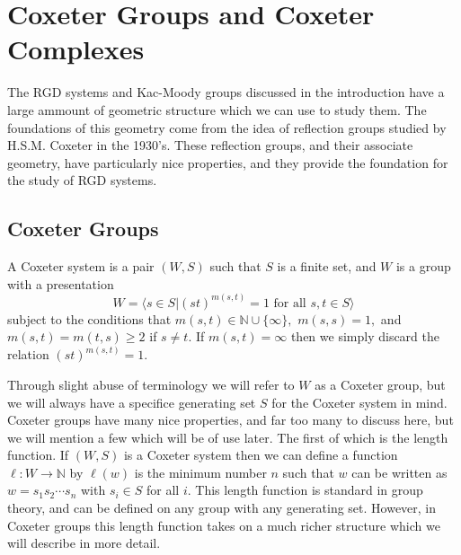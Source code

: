\documentclass[class=book, crop=false,12 pt]{standalone}
\begin{document}
\chapter{Coxeter Groups and Coxeter Complexes}
\label{ch:coxeter}
The RGD systems and Kac-Moody groups discussed in the introduction have a large ammount of geometric structure which we can use to study them. The foundations of this geometry come from the idea of reflection groups studied by H.S.M. Coxeter in the 1930's. These reflection groups, and their associate geometry, have particularly nice properties, and they provide the foundation for the study of RGD systems.

\section{Coxeter Groups}
\label{sec:coxgrp}
\begin{defn}
	\label{def:coxgrp}
	A Coxeter system is a pair $(W,S)$ such that $S$ is a finite set, and $W$ is a group with a presentation
	\[
		W=\langle s\in S|(st)^{m(s,t)}=1\text{ for all }s,t\in S\rangle
	\]
	subject to the conditions that $m(s,t)\in \mathbb{N}\cup \{\infty\},$ $m(s,s)=1,$ and $m(s,t)=m(t,s)\ge 2$ if $s\neq t.$ If $m(s,t)=\infty$ then we simply discard the relation $(st)^{m(s,t)}=1.$
\end{defn}

Through slight abuse of terminology we will refer to $W$ as a Coxeter group, but we will always have a specifice generating set $S$ for the Coxeter system in mind. Coxeter groups have many nice properties, and far too many to discuss here, but we will mention a few which will be of use later. The first of which is the length function. If $(W,S)$ is a Coxeter system then we can define a function $\ell:W\to \mathbb{N}$ by $\ell(w)$ is the minimum number $n$ such that $w$ can be written as $w=s_1s_2\cdots s_n$ with $s_i\in S$ for all $i.$ This length function is standard in group theory, and can be defined on any group with any generating set. However, in Coxeter groups this length function takes on a much richer structure which we will describe in more detail.
\end{document}
